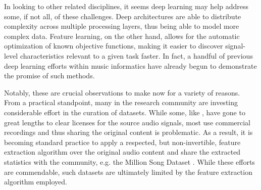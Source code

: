 In looking to other related disciplines, it seems deep learning may help address some, if not all, of these challenges.
Deep architectures are able to distribute complexity across multiple processing layers, thus being able to model more complex data.
Feature learning, on the other hand, allows for the automatic optimization of known objective functions, making it easier to discover signal-level characteristics relevant to a given task faster.
In fact, a handful of previous deep learning efforts within music informatics have already begun to demonstrate the promise of such methods.

Notably, these are crucial observations to make now for a variety of reasons.
From a practical standpoint, many in the research community are investing considerable effort in the curation of datasets.
While some, like \cite{Bittner2014Medleydb}, have gone to great lengths to clear licenses for the source audio signals, most use commercial recordings and thus sharing the original content is problematic.
As a result, it is becoming standard practice to apply a respected, but non-invertible, feature extraction algorithm over the original audio content and share the extracted statistics with the community, e.g. the Million Song Dataset \cite{Bertin2011Million}.
While these efforts are commendable, such datasets are ultimately limited by the feature extraction algorithm employed.
